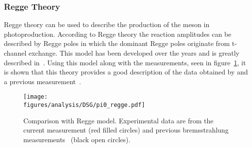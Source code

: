 \subsubsection{Regge Theory}
Regge theory can be used to  describe the production of the \piz meson in photoproduction. According to Regge theory the reaction amplitudes can be described by Regge poles in which the dominant Regge poles originate from t-channel exchange. This model has been developed over the years and is greatly described in~\cite{JPAC}. Using this model along with the  measurements, seen in figure~\ref{fig:pi0_regge}, it is shown that this theory provides a good description of the data obtained by  and a previous measurement~\cite{brem}.
\begin{figure}[h]
	\centerline{\texttt{[image: \\figures/analysis/DSG/pi0\_regge.pdf]}}
	\caption{Comparison with Regge model. Experimental data are from the current measurement (red filled circles) and previous bremsstrahlung measurements~\protect\cite{brem} (black open circles). }
	\label{fig:pi0_regge}
\end{figure}